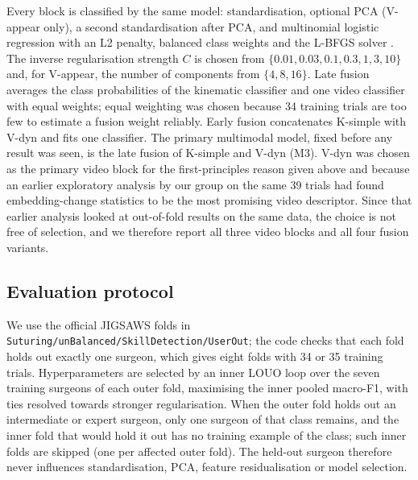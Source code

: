 Every block is classified by the same model: standardisation, optional PCA (V-appear only), a second standardisation after PCA, and multinomial logistic regression with an L2 penalty, balanced class weights and the L-BFGS solver \citep{pedregosa2011sklearn}. The inverse regularisation strength $C$ is chosen from $\{0.01, 0.03, 0.1, 0.3, 1, 3, 10\}$ and, for V-appear, the number of components from $\{4, 8, 16\}$. Late fusion averages the class probabilities of the kinematic classifier and one video classifier with equal weights; equal weighting was chosen because 34 training trials are too few to estimate a fusion weight reliably. Early fusion concatenates K-simple with V-dyn and fits one classifier. The primary multimodal model, fixed before any result was seen, is the late fusion of K-simple and V-dyn (M3). V-dyn was chosen as the primary video block for the first-principles reason given above and because an earlier exploratory analysis by our group on the same 39 trials had found embedding-change statistics to be the most promising video descriptor. Since that earlier analysis looked at out-of-fold results on the same data, the choice is not free of selection, and we therefore report all three video blocks and all four fusion variants.

\subsection{Evaluation protocol}

We use the official JIGSAWS folds in \texttt{Suturing/unBalanced/SkillDetection/UserOut}; the code checks that each fold holds out exactly one surgeon, which gives eight folds with 34 or 35 training trials. Hyperparameters are selected by an inner LOUO loop over the seven training surgeons of each outer fold, maximising the inner pooled macro-F1, with ties resolved towards stronger regularisation. When the outer fold holds out an intermediate or expert surgeon, only one surgeon of that class remains, and the inner fold that would hold it out has no training example of the class; such inner folds are skipped (one per affected outer fold). The held-out surgeon therefore never influences standardisation, PCA, feature residualisation or model selection.

